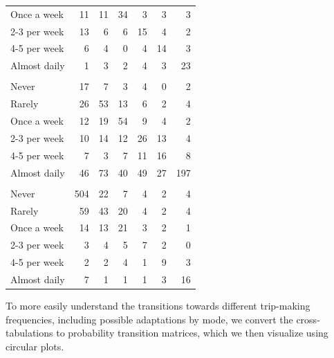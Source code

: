 \documentclass[]{elsarticle} %
\begin{document}
\begin{table}
{\begin{tabular}[t]{lrrrrrr}
\hspace{1em}Once a week & 11 & 11 & 34 & 3 & 3 & 3\\
\hspace{1em}2-3 per week & 13 & 6 & 6 & 15 & 4 & 2\\
\hspace{1em}4-5 per week & 6 & 4 & 0 & 4 & 14 & 3\\
\hspace{1em}Almost daily & 1 & 3 & 2 & 4 & 3 & 23\\
\addlinespace[0.3em]
\multicolumn{7}{l}{\textbf{walk}}\\
\hspace{1em}Never & 17 & 7 & 3 & 4 & 0 & 2\\
\hspace{1em}Rarely & 26 & 53 & 13 & 6 & 2 & 4\\
\hspace{1em}Once a week & 12 & 19 & 54 & 9 & 4 & 2\\
\hspace{1em}2-3 per week & 10 & 14 & 12 & 26 & 13 & 4\\
\hspace{1em}4-5 per week & 7 & 3 & 7 & 11 & 16 & 8\\
\hspace{1em}Almost daily & 46 & 73 & 40 & 49 & 27 & 197\\
\addlinespace[0.3em]
\multicolumn{7}{l}{\textbf{bicycle}}\\
\hspace{1em}Never & 504 & 22 & 7 & 4 & 2 & 4\\
\hspace{1em}Rarely & 59 & 43 & 20 & 4 & 2 & 4\\
\hspace{1em}Once a week & 14 & 13 & 21 & 3 & 2 & 1\\
\hspace{1em}2-3 per week & 3 & 4 & 5 & 7 & 2 & 0\\
\hspace{1em}4-5 per week & 2 & 2 & 4 & 1 & 9 & 3\\
\hspace{1em}Almost daily & 7 & 1 & 1 & 1 & 3 & 16\\
\bottomrule
\end{tabular}}
\end{table}

To more easily understand the transitions towards different trip-making
frequencies, including possible adaptations by mode, we convert the
cross-tabulations to probability transition matrices, which we then
visualize using circular plots.
\end{document}
